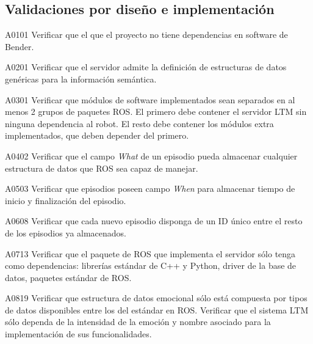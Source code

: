 \subsection{Validaciones por diseño e implementación}

\begin{def-validacion}{A}{01}{01}
	Verificar que el que el proyecto no tiene dependencias en software de Bender.
\end{def-validacion}

\begin{def-validacion}{A}{02}{01}
	Verificar que el servidor admite la definición de estructuras de datos genéricas para la información semántica.	
\end{def-validacion}

\begin{def-validacion}{A}{03}{01}
	Verificar que módulos de software implementados sean separados en al menos 2 grupos de paquetes ROS. El primero debe contener el servidor LTM sin ninguna dependencia al robot. El resto debe contener los módulos extra implementados, que deben depender del primero.	
\end{def-validacion}

\begin{def-validacion}{A}{04}{02}
Verificar que el campo \textit{What} de un episodio pueda almacenar cualquier estructura de datos que ROS sea capaz de manejar.	
\end{def-validacion}

\begin{def-validacion}{A}{05}{03}
Verificar que episodios poseen campo \textit{When} para almacenar tiempo de inicio y finalización del episodio.	
\end{def-validacion}

\begin{def-validacion}{A}{06}{08}
Verificar que cada nuevo episodio disponga de un ID único entre el resto de los episodios ya almacenados.	
\end{def-validacion}

\begin{def-validacion}{A}{07}{13}
Verificar que el paquete de ROS que implementa el servidor sólo tenga como dependencias: librerías estándar de C++ y Python, driver de la base de datos, paquetes estándar de ROS.	
\end{def-validacion}

\begin{def-validacion}{A}{08}{19}
Verificar que estructura de datos emocional sólo está compuesta por tipos de datos disponibles entre los del estándar en ROS. Verificar que el sistema LTM sólo dependa de la intensidad de la emoción y nombre asociado para la implementación de sus funcionalidades.	
\end{def-validacion}

